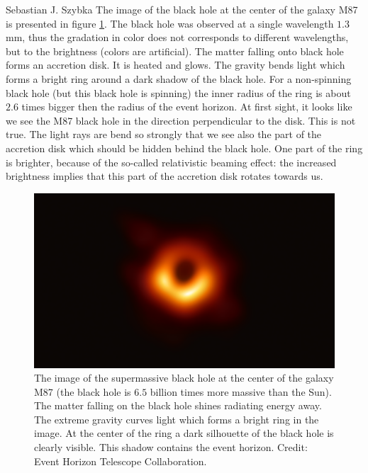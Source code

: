 \begin{artengenv}{Sebastian J. Szybka}
The image of the black hole at the center of the galaxy M87 is presented in figure \ref{bh}. The black hole was observed at a single wavelength $1.3$ mm, thus the gradation in color does not corresponds to different wavelengths, but to the brightness (colors are artificial). The matter falling onto black hole forms an accretion disk. It is heated and glows. The gravity bends light which forms a bright ring around a dark shadow of the black hole. For a non-spinning black hole (but this black hole is spinning) the inner radius of the ring is about $2.6$ times bigger then the radius of the event horizon. At first sight, it looks like we see the M87 black hole in the direction perpendicular to the disk. This is not true. The light rays are bend so strongly that we see also the part of the accretion disk which should be hidden behind the black hole. One part of the ring is brighter, because of the so-called relativistic beaming effect: the increased brightness implies that this part of the accretion disk rotates towards us.
%
\begin{figure}[t!]
\begin{center}
\includegraphics[width=\textwidth]{ART_Szybka/szybka-img.png}
\caption{The image of the supermassive black hole at the center of the galaxy M87 (the black hole is $6.5$ billion times more massive than the Sun). The matter falling on the black hole shines radiating energy away. The extreme gravity curves light which forms a bright ring in the image. At the center of the ring a dark silhouette of the black hole is clearly visible. This shadow contains the event horizon. Credit: Event Horizon Telescope Collaboration.}
\label{bh}
\end{center}
\end{figure}
%


\end{artengenv}

